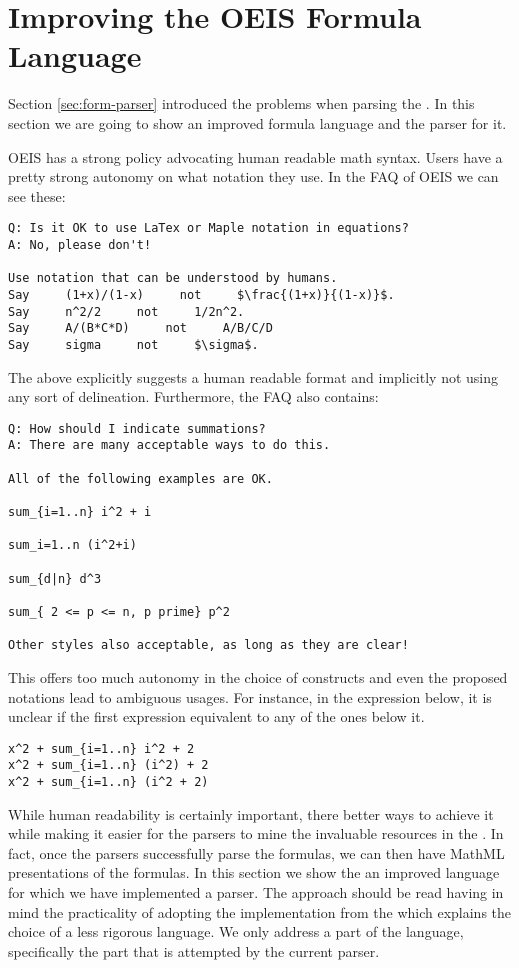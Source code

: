 \section{Improving the OEIS Formula Language} \label{sec:Improve}

Section \ref{sec:form-parser} introduced the problems when parsing the \oeis. In this section we are going to show an
 improved formula language and the parser for it.

OEIS has a strong policy advocating human readable math syntax. Users have a pretty strong autonomy on what notation
they use.
In the FAQ of OEIS we can see these:

\begin{lstlisting}
Q: Is it OK to use LaTex or Maple notation in equations?
A: No, please don't!

Use notation that can be understood by humans.
Say     (1+x)/(1-x)     not     $\frac{(1+x)}{(1-x)}$.
Say     n^2/2     not     1/2n^2.
Say     A/(B*C*D)     not     A/B/C/D
Say     sigma     not     $\sigma$.
\end{lstlisting}

The above explicitly suggests a human readable format and implicitly not using any sort of delineation. Furthermore,
the FAQ also contains:

\begin{lstlisting}
Q: How should I indicate summations?
A: There are many acceptable ways to do this.

All of the following examples are OK.

sum_{i=1..n} i^2 + i

sum_i=1..n (i^2+i)

sum_{d|n} d^3

sum_{ 2 <= p <= n, p prime} p^2

Other styles also acceptable, as long as they are clear!
\end{lstlisting}
This offers too much autonomy in the choice of constructs and even the proposed notations lead to ambiguous usages.
For instance, in the expression below, it is unclear if the first expression equivalent to any of the ones below it.

\begin{lstlisting}
x^2 + sum_{i=1..n} i^2 + 2
x^2 + sum_{i=1..n} (i^2) + 2
x^2 + sum_{i=1..n} (i^2 + 2)
\end{lstlisting}


While human readability is certainly important, there better ways to achieve it while making it easier for the
parsers to mine the invaluable resources in the \oeis. In fact, once the parsers successfully parse the formulas, we
can then have MathML presentations of the formulas. In this section we show the an improved language for which we
have implemented a parser. The approach should be read having in mind the practicality of adopting the implementation
 from the \oeis which explains the choice of a less rigorous language. We only address a part of the language,
 specifically the part that is attempted by the current parser.

